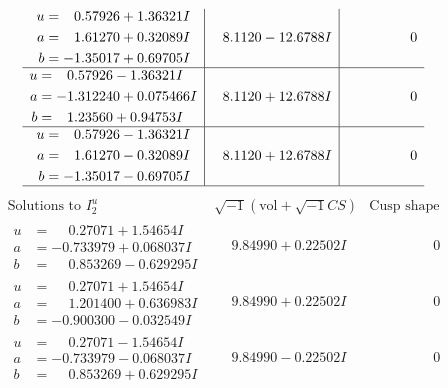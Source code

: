 \documentclass[1p]{elsarticle_modified}
\theoremstyle{definition}
\newcommand{\I}{\sqrt{-1}}
\begin{document}
$$\begin{array}{c|c|c}
\begin{aligned}
u &= \phantom{-}0.57926 + 1.36321 I \\
a &= \phantom{-}1.61270 + 0.32089 I \\
b &= -1.35017 + 0.69705 I\end{aligned}
 & \phantom{-}8.1120 - 12.6788 I & \phantom{-0.000000 } 0 \\ \hline\begin{aligned}
u &= \phantom{-}0.57926 - 1.36321 I \\
a &= -1.312240 + 0.075466 I \\
b &= \phantom{-}1.23560 + 0.94753 I\end{aligned}
 & \phantom{-}8.1120 + 12.6788 I & \phantom{-0.000000 } 0 \\ \hline\begin{aligned}
u &= \phantom{-}0.57926 - 1.36321 I \\
a &= \phantom{-}1.61270 - 0.32089 I \\
b &= -1.35017 - 0.69705 I\end{aligned}
 & \phantom{-}8.1120 + 12.6788 I & \phantom{-0.000000 } 0\\
 \hline 
 \end{array}$$\newpage$$\begin{array}{c|c|c}  
\text{Solutions to }I^u_{2}& \I (\text{vol} + \sqrt{-1}CS) & \text{Cusp shape}\\
 \hline 
\begin{aligned}
u &= \phantom{-}0.27071 + 1.54654 I \\
a &= -0.733979 + 0.068037 I \\
b &= \phantom{-}0.853269 - 0.629295 I\end{aligned}
 & \phantom{-}9.84990 + 0.22502 I & \phantom{-0.000000 } 0 \\ \hline\begin{aligned}
u &= \phantom{-}0.27071 + 1.54654 I \\
a &= \phantom{-}1.201400 + 0.636983 I \\
b &= -0.900300 - 0.032549 I\end{aligned}
 & \phantom{-}9.84990 + 0.22502 I & \phantom{-0.000000 } 0 \\ \hline\begin{aligned}
u &= \phantom{-}0.27071 - 1.54654 I \\
a &= -0.733979 - 0.068037 I \\
b &= \phantom{-}0.853269 + 0.629295 I\end{aligned}
 & \phantom{-}9.84990 - 0.22502 I & \phantom{-0.000000 } 0 \\ \hline\begin{aligned}

\end{aligned}
\end{array}$$
\end{document}
